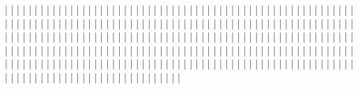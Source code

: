 |    |    |    |    |    |    |
|    |    |    |    |    |    |
|    |    |    |    |    |    |
|    |    |    |    |    |    |
|    |    |    |    |    |    |
|    |    |    |    |    |    |
|    |    |    |    |    |    |
|    |    |    |    |    |    |
|    |    |    |    |    |    |
|    |    |    |    |    |    |
|    |    |    |    |    |    |
|    |    |    |    |    |    |
|    |    |    |    |    |    |
|    |    |    |    |    |    |
|    |    |    |    |    |    |
|    |    |    |    |    |    |
|    |    |    |    |    |    |
|    |    |    |    |    |    |
|    |    |    |    |    |    |
|    |    |    |    |    |    |
|    |    |    |    |    |    |
|    |    |    |    |    |    |
|    |    |    |    |    |    |
|    |    |    |    |    |    |
|    |    |    |    |    |    |
|    |    |    |    |    |    |
|    |    |    |    |    |    |
|    |    |    |    |    |    |
|    |    |    |    |    |    |
|    |    |    |    |    |    |
|    |    |    |    |    |    |
|    |    |    |    |    |    |
|    |    |    |    |    |    |
|    |    |    |    |    |    |
|    |    |    |    |    |    |
|    |    |    |    |    |    |
|    |    |    |    |    |    |
|    |    |    |    |    |    |
|    |    |    |    |    |    |
|    |    |    |    |    |    |
|    |    |    |    |    |    |
|    |    |    |    |    |    |
|    |    |    |    |    |    |
|    |    |    |    |    |    |
|    |    |    |    |    |    |
|    |    |    |    |    |    |
|    |    |